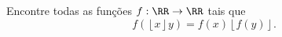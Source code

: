 Encontre todas as funções $f: \RR \to \RR$ tais que
$$ f(\left\lfloor x\right\rfloor y)=f(x)\left\lfloor f(y)\right\rfloor. $$
